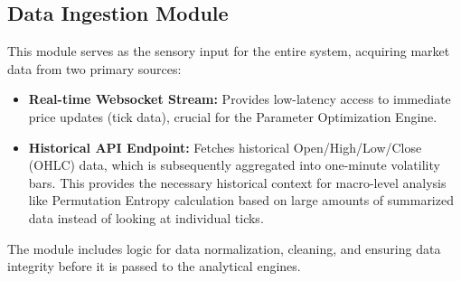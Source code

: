 \documentclass[11pt]{article}
\begin{document}
\subsection{Data Ingestion Module}
This module serves as the sensory input for the entire system, acquiring market data from two primary sources:
\begin{itemize}
    \item \textbf{Real-time Websocket Stream:} Provides low-latency access to immediate price updates (tick data), crucial for the Parameter Optimization Engine.
    \item \textbf{Historical API Endpoint:} Fetches historical Open/High/Low/Close (OHLC) data, which is subsequently aggregated into one-minute volatility bars. This provides the necessary historical context for macro-level analysis like Permutation Entropy calculation based on large amounts of summarized data instead of looking at individual ticks.
\end{itemize}
The module includes logic for data normalization, cleaning, and ensuring data integrity before it is passed to the analytical engines.
\end{document}
